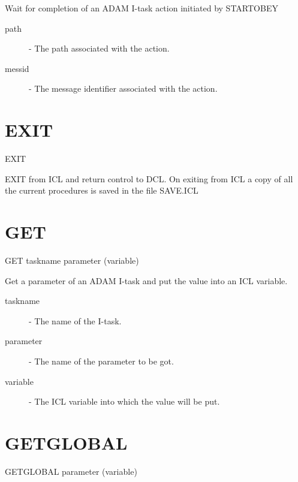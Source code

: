 \documentclass[twoside,11pt]{report}
\newcommand{\xlabel}[1]{}
\begin{document}
 Wait for completion of an ADAM I-task action initiated by STARTOBEY

\begin{description}

\item[path]  -  The path associated with the action.

\item[messid]  -  The message identifier associated with the action.

\end{description}

\section{\xlabel{EXIT}EXIT\label{EXIT}}

   EXIT

 EXIT from ICL and return control to DCL. On exiting from ICL a
 copy of all the current procedures is saved in the file SAVE.ICL

\section{\xlabel{GET}GET\label{GET}}

   GET \hspace{.5cm} taskname \hspace{.5cm} parameter \hspace{.5cm} (variable)

 Get a parameter of an ADAM I-task and put the value into an ICL variable.

\begin{description}

\item[taskname] - The name of the I-task.

\item[parameter] - The name of the parameter to be got.

\item[variable] - The ICL variable into which the value will be put.

\end{description}


\section{\xlabel{GETGLOBAL}GETGLOBAL\label{GETGLOBAL}}

   GETGLOBAL \hspace{.5cm}  parameter \hspace{.5cm} (variable)
\end{document}
